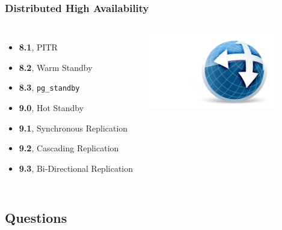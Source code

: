 \documentclass[english]{beamer}
\begin{document}
\begin{frame}[fragile]
  \frametitle{Distributed High Availability}

  \linebreak

\begin{columns}[c]

  \begin{itemize}
   \item<1-> \textbf{8.1}, PITR
   \item<2-> \textbf{8.2}, Warm Standby
   \item<3-> \textbf{8.3}, \texttt{pg\_standby}
   \item<4-> \textbf{9.0}, Hot Standby
   \item<5-> \textbf{9.1}, Synchronous Replication
   \item<6-> \textbf{9.2}, Cascading Replication
   \item<7-> \textbf{9.3}, \alert{Bi-Directional Replication}
  \end{itemize}  

\includegraphics[height=9em]{bdr.png}
\end{columns}
\end{frame}

\subsection{Questions}

\end{document}

